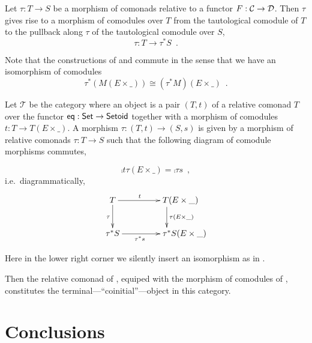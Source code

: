 \documentclass{amsart}
\begin{document}
\begin{definition}
  Let $\tau : T\to S$ be a morphism of comonads relative to a functor $F : {\mathcal{C}} \to \mathcal{D}$.
  Then $\tau$ gives rise to a morphism of comodules over $T$ from the tautological comodule
  of $T$ to the pullback along $\tau$ of the tautological comodule over $S$,
  \[ \tau : T \to \tau^*S \enspace . \]
\end{definition}


\begin{remark}\label{rem:prod_pullback_commute}
 Note that the constructions of  and  commute in the sense that
 we have an isomorphism of comodules \[\tau^*(M(E\times \_)) \cong (\tau^*M)(E \times \_) \enspace . \]
\end{remark}



\begin{example}\label{ex:final_sem_tri}
   Let $\mathcal{T}$ be the category where an object is a pair $(T,t)$ of a relative comonad $T$ over the functor
   $\mathsf{eq}: \mathsf{Set} \to \mathsf{Setoid}$ together with a morphism of comodules $t : T \to T(E \times \_)$.
   A morphism $\tau : (T,t) \to (S,s)$ is given by a morphism of relative comonads $\tau : T \to S$ such that
   the following diagram of comodule morphisms commutes,
   
   \[     \comp{t}{\tau(E\times \_)} = \comp{\tau}{s} \enspace , \]
   i.e.\, diagrammatically,   
   \[ \begin{xy}
       \xymatrix{   T  \ar[r]^t \ar[d]_{\tau}  &  **[r]T (E\times \_ )\ar[d]^{\tau(E\times \_)} \\
                    \tau^*S  \ar[r]_{\tau^*s}  &  **[r] \tau^*S (E\times \_ )
        }
      \end{xy}
   \]

   \noindent
   Here in the lower right corner we silently insert an isomorphism as in .
   
   Then the relative comonad of , equiped with the morphism of comodules of ,
   constitutes the terminal---\enquote{coinitial}---object in this category.
   
\end{example}

\section{Conclusions}



\printbibliography
\end{document}
